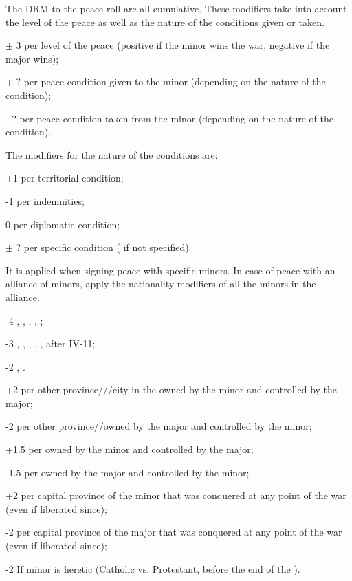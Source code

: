 \label{chPeace:peace minors modifiers}
The DRM to the peace roll are all cumulative.
 These modifiers take into account the level of
the peace as well as the nature of the conditions given or taken.
\begin{modlist}
\item[$\pm$ 3] per level of the peace (positive if the minor wins the war,
  negative if the major wins);
\item[+ ?] per peace condition given to the minor (depending on the nature of
  the condition);
\item[- ?] per peace condition taken from the minor (depending on the nature of
  the condition).
\end{modlist}
\bparag The modifiers for the nature of the conditions are:
\begin{modlist}
\item[+1] per territorial condition;
\item[-1] per indemnities;
\item[0] per diplomatic condition;
\item[$\pm$ ?] per specific condition ( if not specified).
\end{modlist}
It is applied when signing peace with specific minors. In case of peace with
an alliance of minors, apply the nationality modifiers of all the minors in
the alliance.
\begin{modlist}
\item[-4] , , , ,
;
\item[-3] , , , ,
,   after IV-11;
\item[-2] , .
\end{modlist}
\begin{modlist}
\item[+2] per other province/\TP\faceplus/\COL/city in the \ROTW owned by the
  minor and controlled by the major;
\item[-2] per other province/\TP\faceplus/\COL owned by the major and
  controlled by the minor;
\item[+1.5] per \TP\facemoins owned by the minor and controlled by the major;
\item[-1.5] per \TP\facemoins owned by the major and controlled by the minor;
\item[+2] per capital province of the minor that was conquered at any point of
  the war (even if liberated since);
\item[-2] per capital province of the major that was conquered at any point of
  the war (even if liberated since);
\item[-2] If minor is heretic (Catholic vs. Protestant, before the end of the
  ).
\end{modlist}

